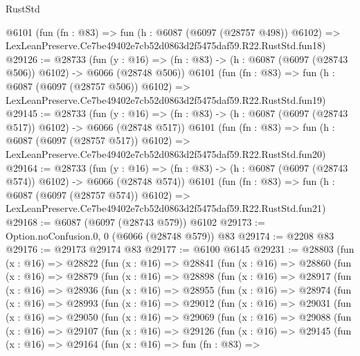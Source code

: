 \begin{lexlean}{RustStd}
\begin{coremodule}
    @6101
    (fun (fn : @83) =>
    fun (h : @6087 (@6097 (@28757 @498)) @6102) =>
    LexLeanPreserve.Ce7be49402e7cb52d0863d2f5475daf59.R22.RustStd.fun18)
@29126 := @28733
    (fun (y : @16) => (fn : @83) -> (h : @6087 (@6097 (@28743 @506)) @6102) -> @6066 (@28748 @506))
    @6101
    (fun (fn : @83) =>
    fun (h : @6087 (@6097 (@28757 @506)) @6102) =>
    LexLeanPreserve.Ce7be49402e7cb52d0863d2f5475daf59.R22.RustStd.fun19)
@29145 := @28733
    (fun (y : @16) => (fn : @83) -> (h : @6087 (@6097 (@28743 @517)) @6102) -> @6066 (@28748 @517))
    @6101
    (fun (fn : @83) =>
    fun (h : @6087 (@6097 (@28757 @517)) @6102) =>
    LexLeanPreserve.Ce7be49402e7cb52d0863d2f5475daf59.R22.RustStd.fun20)
@29164 := @28733
    (fun (y : @16) => (fn : @83) -> (h : @6087 (@6097 (@28743 @574)) @6102) -> @6066 (@28748 @574))
    @6101
    (fun (fn : @83) =>
    fun (h : @6087 (@6097 (@28757 @574)) @6102) =>
    LexLeanPreserve.Ce7be49402e7cb52d0863d2f5475daf59.R22.RustStd.fun21)
@29168 := @6087 (@6097 (@28743 @579)) @6102
@29173 := Option.noConfusion.{0, 0} (@6066 (@28748 @579)) @83
@29174 := @2208 @83
@29176 := @29173 @29174 @83
@29177 := @6100 @6145
@29231 := @28803
    (fun (x : @16) =>
    @28822
      (fun (x : @16) =>
      @28841
        (fun (x : @16) =>
        @28860
          (fun (x : @16) =>
          @28879
            (fun (x : @16) =>
            @28898
              (fun (x : @16) =>
              @28917
                (fun (x : @16) =>
                @28936
                  (fun (x : @16) =>
                  @28955
                    (fun (x : @16) =>
                    @28974
                      (fun (x : @16) =>
                      @28993
                        (fun (x : @16) =>
                        @29012
                          (fun (x : @16) =>
                          @29031
                            (fun (x : @16) =>
                            @29050
                              (fun (x : @16) =>
                              @29069
                                (fun (x : @16) =>
                                @29088
                                  (fun (x : @16) =>
                                  @29107
                                    (fun (x : @16) =>
                                    @29126
                                      (fun (x : @16) =>
                                      @29145
                                        (fun (x : @16) =>
                                        @29164
                                          (fun (x : @16) =>
                                          fun (fn : @83) =>

\end{coremodule}
\end{lexlean}
